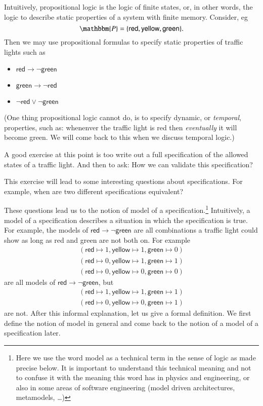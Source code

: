 \documentclass[11pt]{article}
\newcommand{\imp}{\ensuremath{\rightarrow}}
\newcommand{\ou}{\ensuremath{\vee}} %
\newcommand{\bbP}{\mathbbm{P}}
\newcounter{quest}
\newcounter{prop}
\begin{document}
\newcommand{\red}{\mathsf{red}}
\newcommand{\yellow}{\mathsf{yellow}}
\newcommand{\green}{\mathsf{green}}

\begin{example}
  Intuitively, propositional logic is the logic of finite states, or,
  in other words, the
  logic to describe static properties of a system with finite memory. Consider,
  eg \[\bbP=\{\red,\yellow,\green\}.\] Then we may use propositional
  formulas to specify static properties of traffic lights such as
\begin{itemize}
\item $\red\imp\neg\green$
\item $\green\imp\neg\red$
\item $\neg\red\ou\neg\green$
\end{itemize}
(One thing propositional logic cannot do, is to specify dynamic, or
\emph{temporal}, properties, such as: whenenver the traffic light is
red then \emph{eventually} it will become green. We will come back to
this when we discuss temporal logic.) 
\end{example}

\medskip\noindent A good exercise at
this point is too write out a full specification of the allowed
states of a traffic light. And then to ask: How we can
validate this specification?

\medskip\noindent This exercise will lead to some interesting
questions about specifications. For example, when are two different
specifications equivalent?

\bigskip These questions lead us to the notion of model of a
specification.\footnote{Here we use the word model as a technical term
  in the sense of logic as made precise below. It is important to
  understand this technical meaning and not to confuse it with the
  meaning this word has in physics and engineering, or also in some
  areas of software engineering (model driven architectures,
  metamodels, \ldots)} Intuitively, a model of a specification
describes a situation in which the specification is true. For
example, the models of  $\red\imp\neg\green$ are all combinations a
traffic light could show as long as red and green are not both on. For
example 
\begin{gather*}
(\red\mapsto 1, \yellow\mapsto 1, \green\mapsto 0) \\
(\red\mapsto 0, \yellow\mapsto 1, \green\mapsto 1) \\
(\red\mapsto 0, \yellow\mapsto 0, \green\mapsto 0)
\end{gather*}
are all models of $\red\imp\neg\green$, but
\begin{gather*}
(\red\mapsto 1, \yellow\mapsto 1, \green\mapsto 1) \\
(\red\mapsto 0, \yellow\mapsto 0, \green\mapsto 1) 
\end{gather*}
are not. After this informal explanation, let us give a formal
definition. We first define the notion of model in general and come
back to the notion of a model of a specification later.
\end{document}
